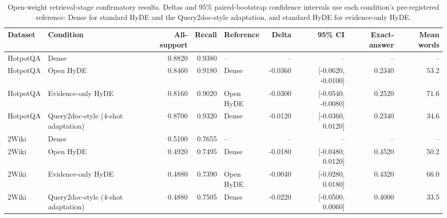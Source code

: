 \begin{table}[t]
\centering
\caption{Open-weight retrieval-stage confirmatory results. Deltas and 95\% paired-bootstrap confidence intervals use each condition's pre-registered reference: Dense for standard HyDE and the Query2doc-style adaptation, and standard HyDE for evidence-only HyDE.}
\label{tab:open_generator_query2doc}
\scriptsize
\setlength{\tabcolsep}{3.5pt}
\begin{tabular}{llrrlrrrr}
\toprule
Dataset & Condition & All-support & Recall & Reference & Delta & 95\% CI & Exact-answer & Mean words \\
\midrule
HotpotQA & Dense & 0.8820 & 0.9380 & -- & -- & -- & -- & -- \\
HotpotQA & Open HyDE & 0.8460 & 0.9180 & Dense & -0.0360 & [-0.0620, -0.0100] & 0.2340 & 53.2 \\
HotpotQA & Evidence-only HyDE & 0.8160 & 0.9020 & Open HyDE & -0.0300 & [-0.0540, -0.0080] & 0.2520 & 71.6 \\
HotpotQA & Query2doc-style (4-shot adaptation) & 0.8700 & 0.9320 & Dense & -0.0120 & [-0.0360, 0.0120] & 0.2340 & 34.6 \\
\midrule
2Wiki & Dense & 0.5100 & 0.7655 & -- & -- & -- & -- & -- \\
2Wiki & Open HyDE & 0.4920 & 0.7495 & Dense & -0.0180 & [-0.0480, 0.0120] & 0.4520 & 50.2 \\
2Wiki & Evidence-only HyDE & 0.4880 & 0.7390 & Open HyDE & -0.0040 & [-0.0280, 0.0180] & 0.4320 & 66.0 \\
2Wiki & Query2doc-style (4-shot adaptation) & 0.4880 & 0.7505 & Dense & -0.0220 & [-0.0500, 0.0060] & 0.4000 & 33.5 \\
\bottomrule
\end{tabular}
\end{table}

